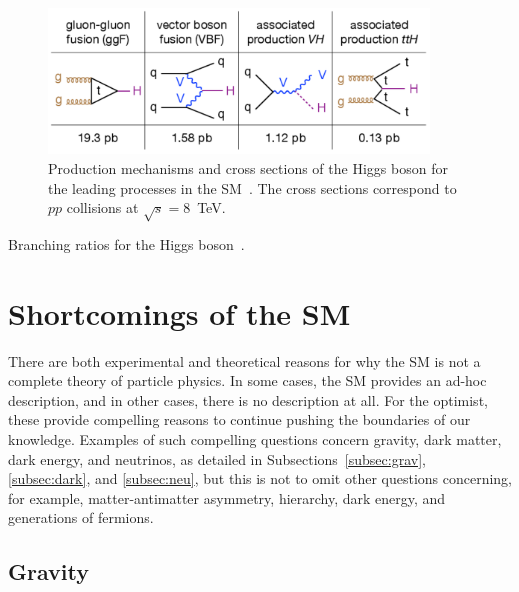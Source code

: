 \begin{figure}[ht]
 \begin{center}
    \includegraphics[width=0.90\textwidth]{figures/intro/higgsproductions.pdf}
      \end{center}
\caption{Production mechanisms and cross sections of the Higgs boson
for the leading processes in the SM~\cite{Tuna:thesis}. The cross sections correspond to
$pp$ collisions at $\sqrt{s} = 8$~TeV.}
\label{fig:crosssections}
\end{figure}

\begin{table}[bp]
  \centering
  \renewcommand{\arraystretch}{1.4}
  \caption{Branching ratios for the Higgs boson~\cite{LHC:SMHiggsBR}.}
  
  \label{table:BR_SMhiggs}
\end{table}




\section{Shortcomings of the SM\label{sec:SMshortcomings}}

There are both experimental and theoretical reasons for why the SM is not a complete theory of
particle physics. In some cases, the SM provides an ad-hoc description, and in other cases, there
is no description at all. For the optimist, these provide compelling reasons to continue
pushing the boundaries of our knowledge. Examples of such compelling questions concern gravity,
dark matter, dark energy, and neutrinos, as detailed in Subsections~\ref{subsec:grav},
\ref{subsec:dark}, and \ref{subsec:neu}, but this is not to omit other questions concerning,
for example, matter-antimatter asymmetry, hierarchy, dark energy, and generations of fermions.

\subsection{Gravity\label{subsec:grav}}

